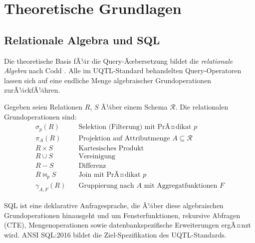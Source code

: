 ﻿%
\section{Theoretische Grundlagen}
\label{sec:grundlagen}

\subsection{Relationale Algebra und SQL}
\label{subsec:rel_algebra}

Die theoretische Basis fÃ¼r die Query-Ãœbersetzung bildet die \emph{relationale
Algebra} nach Codd \cite{codd1970relational}. Alle im UQTL-Standard behandelten
Query-Operatoren lassen sich auf eine endliche Menge algebraischer
Grundoperationen zurÃ¼ckfÃ¼hren.

\begin{definition}
\label{def:rel_ops}
Gegeben seien Relationen $R$, $S$ Ã¼ber einem Schema $\mathcal{R}$.
Die relationalen Grundoperationen sind:
\begin{align*}
  \sigma_p(R) &\quad \text{Selektion (Filterung) mit PrÃ¤dikat } p \\
  \pi_A(R)    &\quad \text{Projektion auf Attributmenge } A \subseteq \mathcal{R} \\
  R \times S  &\quad \text{Kartesisches Produkt} \\
  R \cup S    &\quad \text{Vereinigung} \\
  R - S       &\quad \text{Differenz} \\
  R \bowtie_p S &\quad \text{Join mit PrÃ¤dikat } p \\
  \gamma_{A,F}(R) &\quad \text{Gruppierung nach } A \text{ mit Aggregatfunktionen } F
\end{align*}
\end{definition}

SQL ist eine deklarative Anfragesprache, die Ã¼ber diese algebraischen
Grundoperationen hinausgeht und um Fensterfunktionen, rekursive Abfragen
(CTE), Mengenoperationen sowie datenbankspezifische Erweiterungen ergÃ¤nzt wird.
ANSI SQL:2016 \cite{ansi_sql_2016} bildet die Ziel-Spezifikation des UQTL-Standards.

